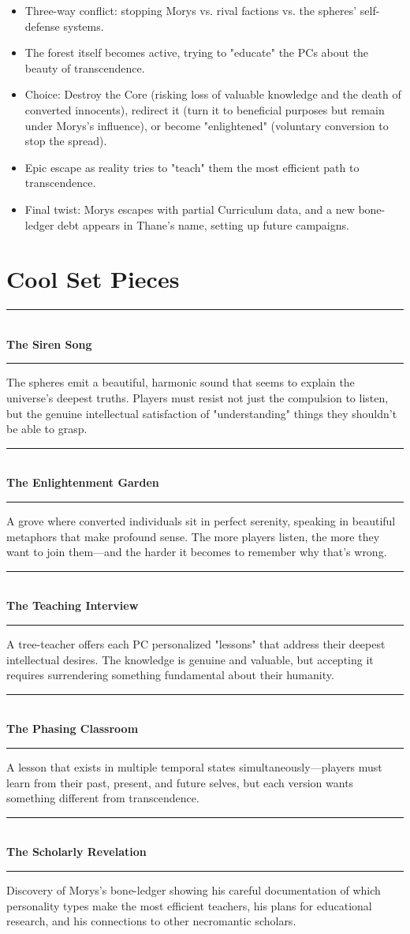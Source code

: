 \documentclass[11pt,twoside]{book}
\newenvironment{adventurebox}[1]{%
  \begin{mdframed}[%
    linewidth=2pt,%
    linecolor=black,%
    backgroundcolor=gray!10,%
    innertopmargin=10pt,%
    innerbottommargin=10pt,%
    innerrightmargin=10pt,%
    innerleftmargin=10pt,%
    frametitle={#1},%
    frametitlefont=\sffamily\bfseries,%
  ]%
}{%
  \end{mdframed}%
}
\newcommand{\sessionbox}[2]{%
  \begin{adventurebox}{Session #1: #2}
}
\newcommand{\endsession}{%
  \end{adventurebox}
}
\newcommand{\setpiece}[1]{%
  \needspace{4\baselineskip}%
  \begin{center}
    \rule{\textwidth}{1pt}\\
    \textbf{\sffamily\Large #1}\\
    \rule{\textwidth}{1pt}
  \end{center}
}
\begin{document}
\sessionbox{5}{Knowledge or Humanity}
\begin{itemize}
    \item Three-way conflict: stopping Morys vs. rival factions vs. the spheres' self-defense systems.
    \item The forest itself becomes active, trying to "educate" the PCs about the beauty of transcendence.
    \item Choice: Destroy the Core (risking loss of valuable knowledge and the death of converted innocents), redirect it (turn it to beneficial purposes but remain under Morys's influence), or become "enlightened" (voluntary conversion to stop the spread).
    \item Epic escape as reality tries to "teach" them the most efficient path to transcendence.
    \item Final twist: Morys escapes with partial Curriculum data, and a new bone-ledger debt appears in Thane's name, setting up future campaigns.
\end{itemize}
\endsession

\chapter{Cool Set Pieces}

\setpiece{The Siren Song}
The spheres emit a beautiful, harmonic sound that seems to explain the universe's deepest truths. Players must resist not just the compulsion to listen, but the genuine intellectual satisfaction of "understanding" things they shouldn't be able to grasp.

\setpiece{The Enlightenment Garden}
A grove where converted individuals sit in perfect serenity, speaking in beautiful metaphors that make profound sense. The more players listen, the more they want to join them---and the harder it becomes to remember why that's wrong.

\setpiece{The Teaching Interview}
A tree-teacher offers each PC personalized "lessons" that address their deepest intellectual desires. The knowledge is genuine and valuable, but accepting it requires surrendering something fundamental about their humanity.

\setpiece{The Phasing Classroom}
A lesson that exists in multiple temporal states simultaneously---players must learn from their past, present, and future selves, but each version wants something different from transcendence.

\setpiece{The Scholarly Revelation}
Discovery of Morys's bone-ledger showing his careful documentation of which personality types make the most efficient teachers, his plans for educational research, and his connections to other necromantic scholars.
\end{document}
